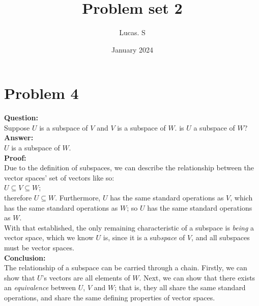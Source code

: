 \documentclass[11pt,oneside,letterpaper]{article}
\title{Problem set 2}
\author{Lucas. S}
\date{January 2024}
\newcommand{\ident}[0]{\\\indent}
\begin{document}
\maketitle
\section*{Problem 4}
\textbf{Question:}\\
Suppose $U$ is a subspace of $V$ and $V$ is a subspace of $W$. is $U$ a subspace of $W$?
\vspace*{8pt}\\
\textbf{Answer:}\\
$U$ is a subspace of $W$.
%
\vspace*{8pt}\\
\textbf{Proof:}\\
Due to the definition of subspaces, we can describe the relationship between the vector spaces' set of vectors like so:
\ident
$U\subseteq V\subseteq W$;\\
 therefore $U \subseteq W$. Furthermore, $U$ has the same standard operations as $V$, which has the same standard operations as $W$; so $U$ has the same standard operations as $W$.\\
With that established, the only remaining characteristic of a subspace is \textit{being} a vector space, which we know $U$ is, since it is a sub\textit{space} of $V$, and all subspaces must be vector spaces.
\vspace*{8pt}\\
\textbf{Conclusion:}\\
The relationship of a subspace can be carried through a chain. Firstly, we can show that $U$'s vectors are all elements of $W$. Next, we can show that there exists an \textit{equivalence} between $U$, $V$ and $W$; that is, they all share the same standard operations, and share the same defining properties of vector spaces.
\end{document}
